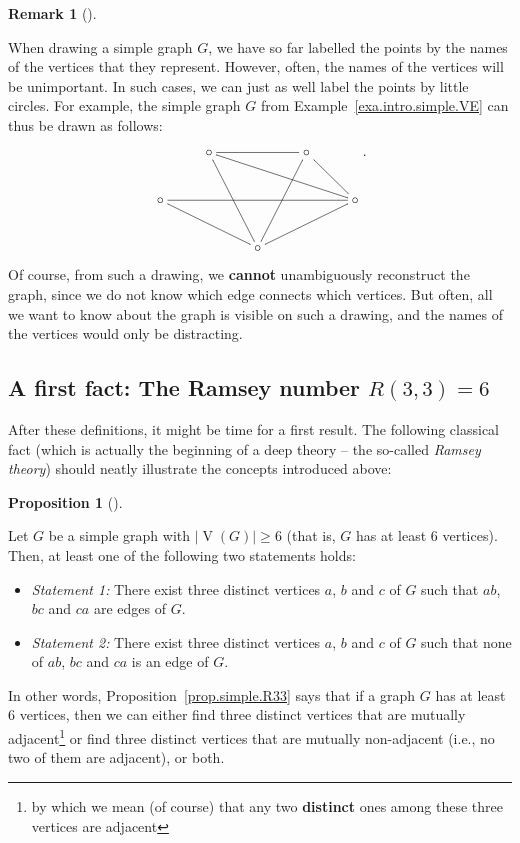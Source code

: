 \documentclass[numbers=enddot,12pt,final,onecolumn,notitlepage]{scrartcl}%
\makeatletter
\theoremstyle{definition}
\newtheorem{prop}[theo]{Proposition}
\newenvironment{proposition}[1][]
{\begin{prop}[#1]\begin{leftbar}}
{\end{leftbar}\end{prop}}
\newtheorem{remk}[theo]{Remark}
\newenvironment{remark}[1][]
{\begin{remk}[#1]\begin{leftbar}}
{\end{leftbar}\end{remk}}
\newcommand{\abs}[1]{\left| #1 \right|}
\newcommand{\tup}[1]{\left( #1 \right)}
\newcommand{\verts}[1]{\operatorname{V}\left( #1 \right)}
\newcommand{\are}{\ar@{-}}
\makeatother
\begin{document}
\begin{remark}
When drawing a simple graph $G$, we have so far labelled the points
by the names of the vertices that they represent. However, often, the
names of the vertices will be unimportant. In such cases, we can just
as well label the points by little circles. For example, the simple
graph $G$ from Example~\ref{exa.intro.simple.VE} can thus be drawn
as follows:
\begin{align*}
\xymatrix{
& \circ \are[rr] \are[rrrd] \are[rdd] & & \circ \are[rd] \are[ldd] \\
\circ \are[rrrr] \are[rrd] & & & & \circ \are[lld] \\
& & \circ
} .
\end{align*}
Of course, from such a drawing, we \textbf{cannot} unambiguously
reconstruct the graph, since we do not know which edge connects which
vertices. But often, all we want to know about the graph is visible on
such a drawing, and the names of the vertices would only be
distracting.
\end{remark}

\subsection{\label{sect.intro.R33}A first fact: The Ramsey number
$R\tup{3,3} = 6$}

After these definitions, it might be time for a first result. The
following classical fact (which is actually the beginning of a deep
theory -- the so-called \textit{Ramsey theory}) should neatly
illustrate the concepts introduced above:

\begin{proposition} \label{prop.simple.R33}
Let $G$ be a simple graph with $\abs{\verts{G}} \geq 6$ (that is,
$G$ has at least $6$ vertices). Then, at least one of the following
two statements holds:

\begin{itemize}
\item \textit{Statement 1:} There exist three distinct vertices $a$,
$b$ and $c$ of $G$ such that $ab$, $bc$ and $ca$ are edges of $G$.

\item \textit{Statement 2:} There exist three distinct vertices $a$,
$b$ and $c$ of $G$ such that none of $ab$, $bc$ and $ca$ is an edge of
$G$.
\end{itemize}
\end{proposition}

In other words, Proposition~\ref{prop.simple.R33} says that if a graph
$G$ has at least $6$ vertices, then we can either find three distinct
vertices that are mutually adjacent\footnote{by which we mean (of
course) that any two \textbf{distinct} ones among these three vertices
are adjacent} or find three distinct vertices that are mutually
non-adjacent (i.e., no two of them are adjacent), or both.
\end{document}

